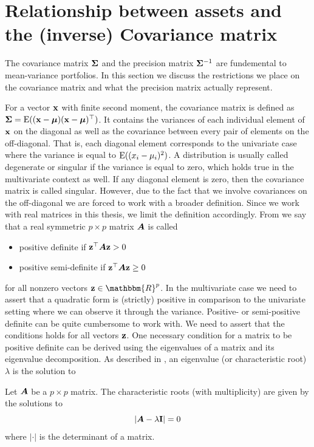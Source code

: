 \documentclass[]{book}\usepackage{knitr}
\begin{document}
\section{Relationship between assets and the (inverse) Covariance matrix}\label{subsec:cov_prec_matrix}
The covariance matrix $\mathbf{\Sigma}$ and the precision matrix $\mathbf{\Sigma}^{-1}$ are fundemental to mean-variance portfolios. In this section we discuss the restrictions we place on the covariance matrix and what the precision matrix actually represent. 

For a vector $\mathbf{x}$ with finite second moment, the covariance matrix is defined as $\mathbf{\Sigma}=\operatorname{E}((\mathbf{x} - \mbox{\boldmath$\mu$})(\mathbf{x} - \mbox{\boldmath$\mu$})^\top)$. 
It contains the variances of each individual element of $\mathbf{x}$ on the diagonal as well as the covariance between every pair of elements on the off-diagonal. 
That is, each diagonal element corresponds to the univariate case where the variance is equal to $\operatorname{E}((x_i - \mu_i)^2)$. 
A distribution is usually called degenerate or singular if the variance is equal to zero, which holds true in the multivariate context as well. 
If any diagonal element is zero, then the covariance matrix is called singular.  
However, due to the fact that we involve covariances on the off-diagonal we are forced to work with a broader definition.  
Since we work with real matrices in this thesis, we limit the definition accordingly. 
From \citet[ch 14.2]{harville1997matrix} we say that a real symmetric $p\times p$ matrix $\mbox{\boldmath$A$}$ is called 
\begin{itemize}
	\item positive definite if $\mathbf{z}^\top \mbox{\boldmath$A$} \mathbf{z} > 0$
	\item positive semi-definite if $\mathbf{z}^\top \mbox{\boldmath$A$} \mathbf{z} \geq 0$
\end{itemize}
for all nonzero vectors $\bz \in \mathbbm{R}^p$.
In the multivariate case we need to assert that a quadratic form is (strictly) positive in comparison to the univariate setting where we can observe it through the variance. 
Positive- or semi-positive definite can be quite cumbersome to work with. 
We need to assert that the conditions holds for all vectors $\mathbf{z}$. 
One necessary condition for a matrix to be positive definite can be derived using the eigenvalues of a matrix and its eigenvalue decomposition. 
As described in \citet[ch. 21]{harville1997matrix}, an eigenvalue (or characteristic root) $\lambda$ is the solution to 
\begin{definition}\label{def:eigenvalue} 
	Let $\mbox{\boldmath$A$}$ be a $p\times p$ matrix. The characteristic roots (with multiplicity) are given by the solutions to
	\begin{equation*}
		\left|\mbox{\boldmath$A$} - \lambda \mathbf{I}\right| = 0
	\end{equation*}
	where $|\cdot|$ is the determinant of a matrix.
\end{definition} 
\end{document}
